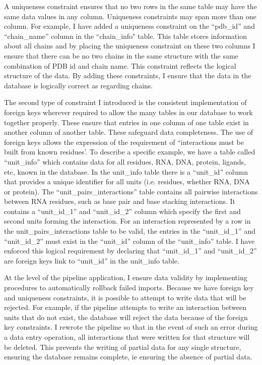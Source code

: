 A uniqueness constraint ensures that no two rows in the same table may have the
same data values in any column. Uniqueness constraints may span more than one
column. For example, I have added a uniqueness constraint on the ``pdb\_id'' and
``chain\_name'' column in the ``chain\_info" table. This table stores information
about all chains and by placing the uniqueness constraint on these two columns I
ensure that there can be no two chains in the same structure with the same
combination of PDB id and chain name. This constraint reflects the logical
structure of the data. By adding these constraints, I ensure that the data in
the database is logically correct as regarding chains.

The second type of constraint I introduced is the consistent implementation of
foreign keys wherever required to allow the many tables in our database to work
together properly. These ensure that entries in one column of one table exist in
another column of another table. These safeguard data completeness. The use of
foreign keys allows the expression of the requirement of ``interactions must be
built from known residues'. To describe a specific example, we have a table
called ``unit\_info'' which contains data for all residues, RNA, DNA, protein,
ligands, etc, known in the database. In the unit\_info table there is a
``unit\_id'' column that provides a unique identifier for all units (i.e.
residues, whether RNA, DNA or protein). The ``unit\_pairs\_interactions'' table
contains all pairwise interactions between RNA residues, such as base pair and
base stacking interactions. It contains a ``unit\_id\_1'' and ``unit\_id\_2'' column
which specify the first and second units forming the interaction. For an
interaction represented by a row in the unit\_pairs\_interactions table to be
valid, the entries in the ``unit\_id\_1'' and ``unit\_id\_2'' must exist  in the
``unit\_id'' column of the ``unit\_info'' table. I have enforced this logical
requirement by declaring that ``unit\_id\_1'' and ``unit\_id\_2'' are foreign keys
link to ``unit\_id'' in the unit\_info table.

At the level of the pipeline application, I ensure data validity by implementing
procedures to automatically rollback failed imports. Because we have foreign key
and uniqueness constraints, it is possible to attempt to write data that will be
rejected. For example, if the pipeline attempts to write an interaction between
units that do not exist, the database will reject the data because of the
foreign key constraints. I rewrote the pipeline so that in the event of such an
error during a data entry operation, all interactions that were written for that
structure will be deleted. This prevents the writing of partial data for any
single structure, ensuring the database remains complete, ie ensuring the
absence of partial data.

